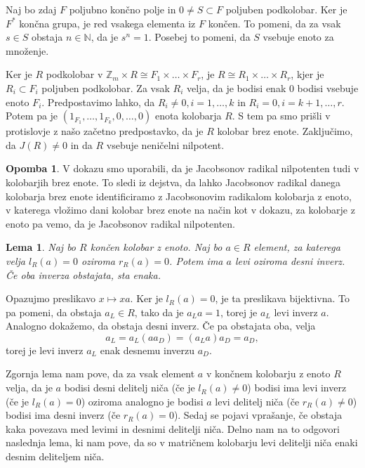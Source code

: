 \documentclass[a4paper, 12pt]{amsart}
\theoremstyle{definition} %
\newtheorem{opomba}[definicija]{Opomba}
\theoremstyle{plain} %
\newtheorem{lema}[definicija]{Lema}
\newcommand{\N}{\mathbb N}
\newcommand{\Z}{\mathbb Z}
\begin{document}
Naj bo zdaj $F$ poljubno končno polje in $0\neq S\subset F$ poljuben podkolobar. Ker je $F^*$ končna grupa, je red vsakega elementa iz $F$ končen. To pomeni, da za vsak $s\in S$ obstaja $n\in \N$, da je $s^n=1$. Posebej to pomeni, da $S$ vsebuje enoto za množenje. 

Ker je $R$ podkolobar v $\Z_m\times R \cong F_1 \times \dots\times F_r$, je $R\cong R_1\times \dots \times R_r$, kjer je $R_i\subset F_i$ poljuben podkolobar. Za vsak $R_i$ velja, da je bodisi enak 0 bodisi vsebuje enoto $F_i$. Predpostavimo lahko, da $R_i \neq 0, i = 1,\dots,k $ in $R_i = 0, i =k+1,\dots,r$. Potem pa je $(1_{F_1},\dots,1_{F_k},0,\dots,0)$ enota kolobarja $R$. S tem pa smo prišli v protislovje z našo začetno predpostavko, da je $R$ kolobar brez enote. Zaključimo, da $J(R)\neq 0$ in da $R$ vsebuje neničelni nilpotent. 

\endproof		

\begin{opomba}
V dokazu smo uporabili, da je Jacobsonov radikal nilpotenten tudi v kolobarjih brez enote. To sledi iz dejstva, da lahko Jacobsonov radikal danega kolobarja brez enote identificiramo z Jacobsonovim radikalom kolobarja z enoto, v katerega vložimo dani kolobar brez enote na način kot v dokazu, za kolobarje z enoto pa vemo, da je Jacobsonov radikal nilpotenten.
\end{opomba}

\begin{lema}
\label{inverz}
Naj bo $R$ končen kolobar z enoto. Naj bo $a\in R$ element, za katerega velja $l_R(a) = 0 $ oziroma $r_R(a)=0$. Potem ima $a$ levi oziroma desni inverz. Če oba inverza obstajata, sta enaka. 
\end{lema}

\proof
Opazujmo preslikavo $x \mapsto xa$. Ker je $l_R(a) = 0$, je ta preslikava bijektivna. To pa pomeni, da obstaja $a_L\in R$, tako da je $a_L a = 1$, torej je $a_L$ levi inverz $a$. Analogno dokažemo, da obstaja desni inverz. Če pa obstajata oba, velja
$$
a_L = a_L(aa_D) = (a_L a)a_D = a_D,
$$
torej je levi inverz $a_L$ enak desnemu inverzu $a_D$.
\endproof

Zgornja lema nam pove, da za vsak element $a$ v končnem kolobarju z enoto $R$ velja, da je $a$ bodisi desni delitelj niča (če je $l_R(a)\neq 0$) bodisi ima levi inverz (če je $l_R(a)=0$) oziroma analogno je bodisi $a$ levi delitelj niča (če $r_R(a) \neq 0$) bodisi ima desni inverz (če $r_R(a) = 0$). Sedaj se pojavi vprašanje, če obstaja kaka povezava med levimi in desnimi delitelji niča. Delno nam na to odgovori naslednja lema, ki nam pove, da so v matričnem kolobarju levi delitelji niča enaki desnim deliteljem niča.
\end{document}
